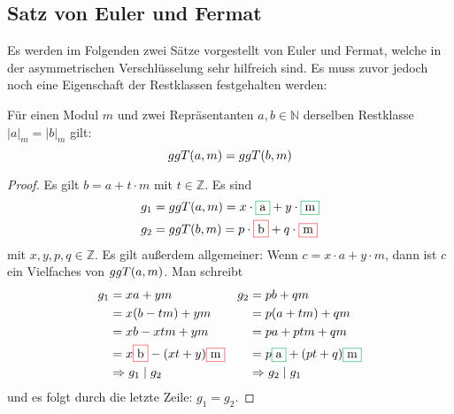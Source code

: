 \subsection{Satz von Euler und Fermat}
Es werden im Folgenden zwei Sätze vorgestellt von Euler und Fermat, welche
in der asymmetrischen Verschlüsselung sehr hilfreich sind. Es muss zuvor jedoch noch eine
Eigenschaft der Restklassen festgehalten werden:

\begin{satz}
  \label{satz:restklasse-ggt}
  Für einen Modul $m$ und zwei Repräsentanten $a,b \in \mathbb{N}$ derselben
  Restklasse $\vert a \vert_m = \vert b \vert_m$ gilt:
  \begin{equation*}
    ggT(a,m) = ggT(b,m)
  \end{equation*}
\end{satz}
\begin{proof}
  Es gilt $b = a + t \cdot m$ mit $t \in \mathbb{Z}$. Es sind
  \begin{align*}
    g_1 & = \ggt{a}{m} = x \cdot \fcolorbox{Green}{White}{a} + y \cdot \fcolorbox{Green}{White}{m} \\
    g_2 & = \ggt{b}{m} = p \cdot \fcolorbox{Red}{White}{b} + q \cdot \fcolorbox{Red}{White}{m}
  \end{align*}
  mit $x,y,p,q \in \mathbb{Z}$. Es gilt außerdem allgemeiner: Wenn $c = x \cdot a + y \cdot m$,
  dann ist $c$ ein Vielfaches von $ggT(a,m)$.
  Man schreibt
  \begin{align*}
    g_1 & = xa + ym                                                        & g_2 & = pb + qm                                                            \\
        & = x(b - tm) + ym                                                 &     & = p(a + tm) + qm                                                     \\
        & = xb - xtm + ym                                                  &     & = pa + ptm + qm                                                      \\
        & = x\fcolorbox{Red}{White}{b} - (xt + y)\fcolorbox{Red}{White}{m} &     & = p\fcolorbox{Green}{White}{a} + (pt + q)\fcolorbox{Green}{White}{m} \\
        & \Rightarrow g_1 \mid g_2                                         &     & \Rightarrow g_2 \mid g_1
  \end{align*}
  und es folgt durch die letzte Zeile: $g_1 = g_2$.
\end{proof}


